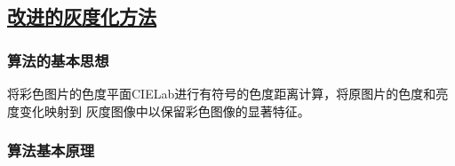 \documentclass[12pt, a4paper, oneside]{ctexart}
\begin{document}
\subsection{\href{https://users.cs.northwestern.edu/~ago820/color2gray/}{改进的灰度化方法}}

\subsubsection{算法的基本思想}
将彩色图片的色度平面CIELab进行有符号的色度距离计算，将原图片的色度和亮度变化映射到
灰度图像中以保留彩色图像的显著特征。

\subsubsection{算法基本原理}
\end{document}

